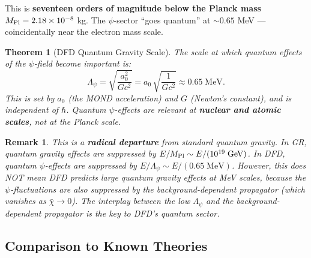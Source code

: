 \documentclass[11pt,a4paper]{article}
\newtheorem{theorem}{Theorem}
\newtheorem{remark}{Remark}
\begin{document}
This is \textbf{seventeen orders of magnitude below the Planck mass} $M_{\rm Pl} = 2.18 \times 10^{-8}$ kg. The $\psi$-sector ``goes quantum'' at $\sim 0.65$ MeV --- coincidentally near the electron mass scale.

\begin{theorem}[DFD Quantum Gravity Scale]
\label{thm:QG-scale}
The scale at which quantum effects of the $\psi$-field become important is:
\begin{equation}
\Lambda_\psi = \sqrt{\frac{a_0^2}{G c^2}} = a_0\,\sqrt{\frac{1}{G c^2}} \approx 0.65\;\text{MeV}.
\end{equation}
This is set by $a_0$ (the MOND acceleration) and $G$ (Newton's constant), and is independent of $\hbar$. Quantum $\psi$-effects are relevant at \textbf{nuclear and atomic scales}, not at the Planck scale.
\end{theorem}

\begin{remark}
This is a \textbf{radical departure} from standard quantum gravity. In GR, quantum gravity effects are suppressed by $E/M_{\rm Pl} \sim E/(10^{19}\;\text{GeV})$. In DFD, quantum $\psi$-effects are suppressed by $E/\Lambda_\psi \sim E/(0.65\;\text{MeV})$. However, this does NOT mean DFD predicts large quantum gravity effects at MeV scales, because the $\psi$-fluctuations are also suppressed by the background-dependent propagator (which vanishes as $\bar\chi \to 0$). The interplay between the low $\Lambda_\psi$ and the background-dependent propagator is the key to DFD's quantum sector.
\end{remark}

\subsection{Comparison to Known Theories}
\end{document}
